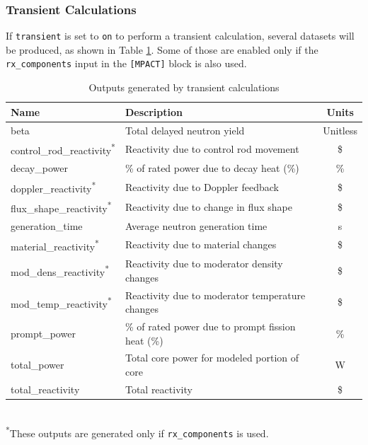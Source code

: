 \FloatBarrier

\subsubsection{Transient Calculations}

If \texttt{transient} is set to \texttt{on} to perform a transient calculation, several datasets will be produced, as shown in Table \ref{tab:transient-edits}.  Some of those are  enabled only if the \texttt{rx\_components} input in the \texttt{[MPACT]} block is also used.

\begin{table}[h]
\centering
\caption{Outputs generated by transient calculations}
\label{tab:transient-edits}
\begin{tabular}{|l|p{}|c|}\hline
\textbf{Name} & \textbf{Description} & \textbf{Units} \\\hline
beta & Total delayed neutron yield & Unitless \\\hline
control\_rod\_reactivity\textsuperscript{*} & Reactivity due to control rod movement & \$ \\\hline
decay\_power & \% of rated power due to decay heat (\%) & \% \\\hline
doppler\_reactivity\textsuperscript{*} & Reactivity due to Doppler feedback & \$ \\\hline
flux\_shape\_reactivity\textsuperscript{*} & Reactivity due to change in flux shape & \$ \\\hline
generation\_time & Average neutron generation time & s \\\hline
material\_reactivity\textsuperscript{*} & Reactivity due to material changes & \$ \\\hline
mod\_dens\_reactivity\textsuperscript{*} & Reactivity due to moderator density changes & \$ \\\hline
mod\_temp\_reactivity\textsuperscript{*} & Reactivity due to moderator temperature changes & \$ \\\hline
prompt\_power & \% of rated power due to prompt fission heat (\%) & \% \\\hline
total\_power & Total core power for modeled portion of core & W \\\hline
total\_reactivity & Total reactivity & \$ \\\hline
\end{tabular}
\\
\small\textsuperscript{*}These outputs are  generated only if \texttt{rx\_components} is used.
\end{table}


